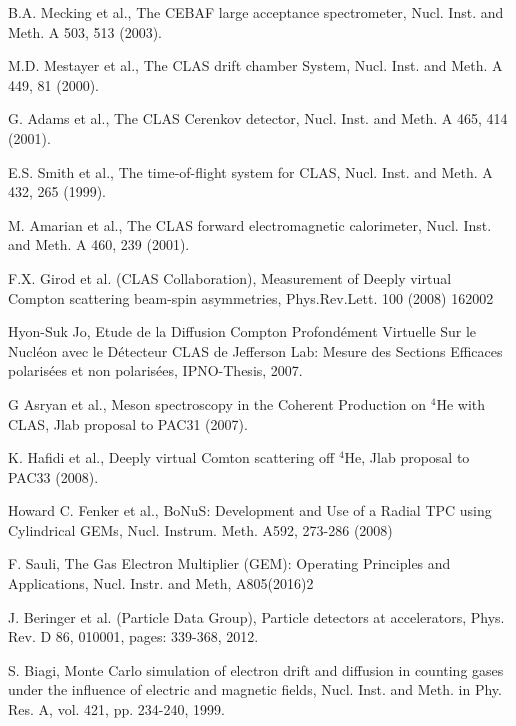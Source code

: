 \documentclass[preprint,5p]{elsarticle}
\begin{document}
\begin{thebibliography}{99}

   B.A. Mecking et al., The CEBAF large acceptance spectrometer, Nucl. Inst. 
   and Meth. A 503, 513 (2003).

   M.D. Mestayer et al., The CLAS drift chamber System, Nucl. Inst.  and Meth.  
   A 449, 81 (2000).

   G. Adams et al., The CLAS Cerenkov detector, Nucl. Inst. and Meth. A 465, 
   414 (2001).

   E.S. Smith et al., The time-of-flight system for CLAS, Nucl.  Inst. and 
   Meth. A 432, 265 (1999).

   M. Amarian et al., The CLAS forward electromagnetic calorimeter, Nucl.  
   Inst. and Meth. A 460, 239 (2001). 

   F.X. Girod et al. (CLAS Collaboration), Measurement of Deeply virtual Compton 
   scattering beam-spin asymmetries, Phys.Rev.Lett. 100 (2008) 162002

   Hyon-Suk Jo, Etude de la Diffusion Compton Profond{\'e}ment Virtuelle Sur le 
   Nucl{\'e}on avec le D{\'e}tecteur CLAS de Jefferson Lab: Mesure des Sections 
   Efficaces polaris{\'e}es et non polaris{\'e}es, IPNO-Thesis, 2007.

   G Asryan et al., Meson spectroscopy in the Coherent Production on $^{4}$He with CLAS, Jlab 
   proposal to PAC31 (2007).

   K. Hafidi et al., Deeply virtual Comton scattering off $^{4}$He, Jlab 
   proposal to PAC33 (2008).

   Howard C. Fenker et al., BoNuS: Development and Use of a Radial TPC using 
   Cylindrical GEMs, Nucl. Instrum. Meth. A592, 273-286 (2008)

   F. Sauli, The Gas Electron Multiplier (GEM): Operating Principles and 
   Applications, Nucl. Instr. and Meth, A805(2016)2

   J. Beringer et al. (Particle Data Group), Particle detectors at 
   accelerators, Phys. Rev. D 86, 010001, pages: 339-368, 2012.

   S. Biagi, Monte Carlo simulation of electron drift and diffusion in counting 
   gases under the influence of electric and magnetic fields, Nucl.  Inst. and 
   Meth. in Phy. Res. A, vol. 421, pp. 234-240, 1999.


\end{thebibliography}
\end{document}
